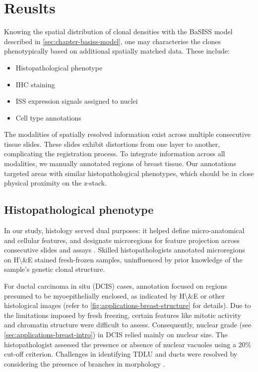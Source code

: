 \section{Reuslts}

\label{sec:modalities-multimodal-results}

Knowing the spatial distribution of clonal densities with the BaSISS model described in \cref{sec:chapter-basiss-model}, one may characterise the clones phenotypically based on additional spatially matched data. These include:

\begin{itemize}
    \item Histopathological phenotype
    \item \ac{IHC} staining
    \item \ac{ISS} expression signals assigned to nuclei
    \item Cell type annotations
\end{itemize}


The modalities of spatially resolved information exist across multiple consecutive tissue slides. These slides exhibit distortions from one layer to another, complicating the registration process. To integrate information across all modalities, we manually annotated regions of breast tissue. Our annotations targeted areas with similar histopathological phenotypes, which should be in close physical proximity on the z-stack.

\subsection{Histopathological phenotype}
\label{sec:modalities-histopath}

In our study, histology served dual purposes: it helped define micro-anatomical and cellular features, and designate microregions for feature projection across consecutive slides and assays . Skilled histopathologists annotated microregions on \acf{H\&E} stained fresh-frozen samples, uninfluenced by prior knowledge of the sample's genetic clonal structure.

For ductal carcinoma in situ (DCIS) cases, annotation focused on regions presumed to be myoepithelially enclosed, as indicated by \ac{H\&E} or other histological images (refer to \cref{fig:applications-breast-structure} for details). Due to the limitations imposed by fresh freezing, certain features like mitotic activity and chromatin structure were difficult to assess. Consequently, nuclear grade (see \cref{sec:applications-breast-intro}) in \ac{DCIS} relied mainly on nuclear size. The histopathologist assessed the presence or absence of nuclear vacuoles using a 20\% cut-off criterion. Challenges in identifying \ac{TDLU} and ducts were resolved by considering the presence of branches in morphology .

